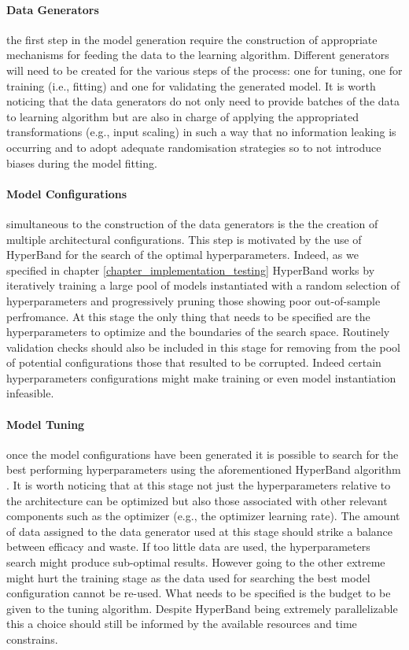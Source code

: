 \paragraph*{Data Generators} the first step in the model generation require the construction of appropriate mechanisms for feeding the data to the learning algorithm. Different generators will need to be created for the various steps of the process: one for tuning, one for training (i.e., fitting) and one for validating the generated model. It is worth noticing that the data generators do not only need to provide batches of the data to learning algorithm but are also in charge of applying the appropriated transformations (e.g., input scaling) in such a way that no information leaking is occurring and to adopt adequate randomisation strategies so to not introduce biases during the model fitting.

\paragraph*{Model Configurations} simultaneous to the construction of the data generators is the the creation of multiple architectural configurations. This step is motivated by the use of HyperBand \cite{li2017hyperband} for the search of the optimal hyperparameters. Indeed, as we specified in chapter \ref{chapter_implementation_testing} HyperBand works by iteratively training a large pool of models instantiated with a random selection of hyperparameters and progressively pruning those showing poor out-of-sample perfromance. At this stage the only thing that needs to be specified are the hyperparameters to optimize and the boundaries of the search space. Routinely validation checks should also be included in this stage for removing from the pool of potential configurations those that resulted to be corrupted. Indeed certain hyperparameters configurations might make training or even model instantiation infeasible.

\paragraph*{Model Tuning} once the model configurations have been generated it is possible to search for the best performing hyperparameters using the aforementioned HyperBand algorithm \cite{li2017hyperband}. It is worth noticing that at this stage not just the hyperparameters relative to the architecture can be optimized but also those associated with other relevant components such as the optimizer (e.g., the optimizer learning rate). The amount of data assigned to the data generator used at this stage should strike a balance between efficacy and waste. If too little data are used, the hyperparameters search might produce sub-optimal results. However going to the other extreme might hurt the training stage as the data used for searching the best model configuration cannot be re-used. What needs to be specified is the budget to be given to the tuning algorithm. Despite HyperBand being extremely parallelizable \cite{li2017hyperband} this a choice should still be informed by the available resources and time constrains.


